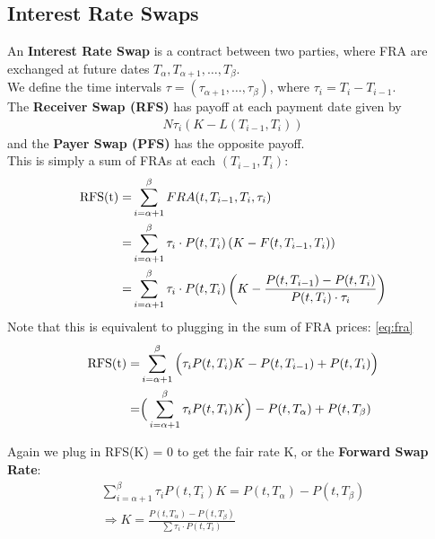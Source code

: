 \subsection{Interest Rate Swaps}
\begin{definition}
    An \textbf{Interest Rate Swap} is a contract between two parties, where FRA are exchanged at future dates $T_{\alpha}, T_{\alpha+1}, \dots, T_{\beta}$.\\
    We define the time intervals $\tau = (\tau_{\alpha+1}, \dots, \tau_{\beta})$, where $\tau_i = T_{i} - T_{i-1}$.\\
    The \textbf{Receiver Swap (RFS)} has payoff at each payment date given by
    \begin{align*}
        N \tau_i (K - L(T_{i-1}, T_i))  
    \end{align*}
    and the  \textbf{Payer Swap (PFS)} has the opposite payoff.\\
    This is simply a sum of FRAs at each $(T_{i-1}, T_i)$:
    \begin{align}
        \text{RFS(t)} =& \sum_{i = \alpha + 1}^{\beta} FRA(t, T_{i-1}, T_i, \tau_i) \notag \\
        =& \sum_{i = \alpha + 1}^{\beta} \tau_i \cdot P(t, T_i) \left( K - F(t, T_{i-1}, T_i) \right) \notag\\
        =& \sum_{i = \alpha + 1}^{\beta} \tau_i \cdot P(t, T_i)
        \left( K - \frac{P(t, T_{i-1}) - P(t, T_i)}{P(t, T_i) \cdot \tau_i}\right) \notag
    \end{align}
    Note that this is equivalent to plugging in the sum of FRA prices: \eqref{eq:fra}
    \begin{align}
        \text{RFS(t)}
        =& \sum_{i = \alpha + 1}^{\beta} \Big( \tau_i P(t, T_i) K - P(t, T_{i-1}) + P(t, T_i) \Big) \notag\\
        =& \Big( \sum_{i = \alpha + 1}^{\beta} \tau_i P(t, T_i) K \Big) - P(t, T_{\alpha}) + P(t, T_{\beta}) 
        \label{eq:IRS}
    \end{align}
    
\end{definition}

Again we plug in RFS(K) = 0 to get the fair rate K, or the \textbf{Forward Swap Rate}:
\begin{align*}
    \sum_{i = \alpha + 1}^{\beta} \tau_i P(t, T_i)  K  = P(t, T_{\alpha}) - P(t, T_{\beta})\\
    \Rightarrow K = \frac{P(t, T_{\alpha}) - P(t, T_{\beta})}{\sum \tau_i \cdot P(t, T_i)}
\end{align*}

